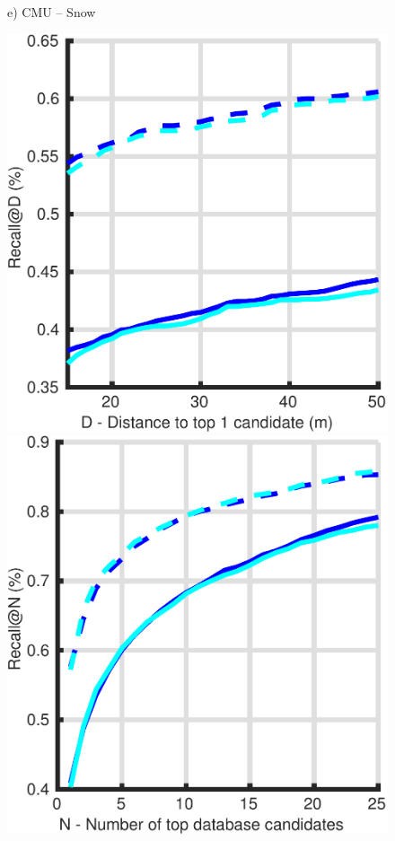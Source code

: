 \begin{figure}
\begin{minipage}{0.27\linewidth}
		e) CMU -- Snow
	\end{minipage}
	\begin{minipage}{0.27\linewidth}
		\center \scriptsize
		\includegraphics[width=\linewidth]{plot/night_ft/Results_cmu_autumn/distance}	
		
		\includegraphics[width=\linewidth]{plot/night_ft/Results_cmu_autumn/recall}
		

\end{minipage}
\end{figure}
